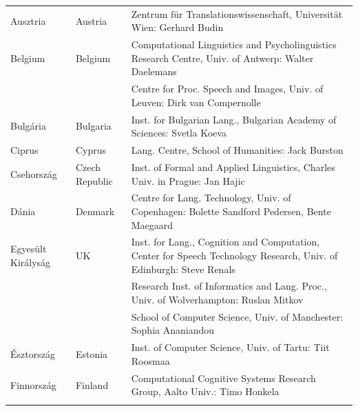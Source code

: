   \cleardoublepage

  \appendix
  
  
  

  \cleardoublepage

  \label{metanetmembers}

  \small
  \begin{longtable}{llp{105mm}}
    Ausztria & \textcolor{grey1}{Austria} & Zentrum für Translationswissenschaft, Universität Wien: Gerhard Budin\\ \addlinespace
    Belgium & \textcolor{grey1}{Belgium} & Computational Linguistics and Psycholinguistics Research Centre, Univ. of Antwerp: Walter Daelemans\\ \addlinespace
    & & Centre for Proc. Speech and Images, Univ. of Leuven: Dirk van Compernolle \\ \addlinespace
    Bulgária & \textcolor{grey1}{Bulgaria} & Inst. for Bulgarian Lang., Bulgarian Academy of Sciences: Svetla Koeva \\ \addlinespace
    Ciprus & \textcolor{grey1}{Cyprus} & Lang. Centre, School of Humanities: Jack Burston \\ \addlinespace
    Csehország & \textcolor{grey1}{Czech Republic} & Inst. of Formal and Applied Linguistics, Charles Univ. in Prague: Jan Hajic \\ \addlinespace
    Dánia &  \textcolor{grey1}{Denmark} & Centre for Lang. Technology, Univ. of Copenhagen: Bolette Sandford Pedersen, Bente Maegaard\\ \addlinespace
    Egyesült Királyság & \textcolor{grey1}{UK} & Inst. for Lang., Cognition and Computation, Center for Speech Technology Research, Univ. of Edinburgh: Steve Renals \\ \addlinespace 
    & & Research Inst. of Informatics and Lang. Proc., Univ. of Wolverhampton: Ruslan Mitkov \\ \addlinespace 
    & & School of Computer Science, Univ. of Manchester: Sophia Ananiandou \\ \addlinespace 
    Észtország & \textcolor{grey1}{Estonia} & Inst. of Computer Science, Univ. of Tartu: Tiit Roosmaa\\ \addlinespace
    Finnország & \textcolor{grey1}{Finland} & Computational Cognitive Systems Research Group, Aalto Univ.: Timo Honkela\\ \addlinespace

\end{longtable}

